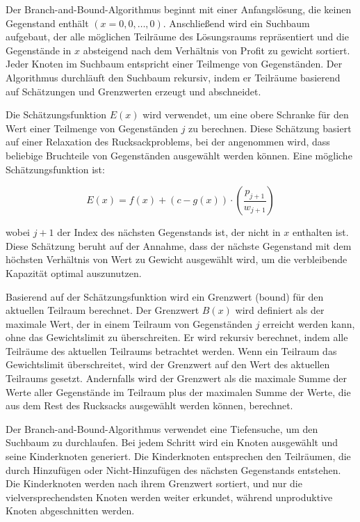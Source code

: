 Der Branch-and-Bound-Algorithmus beginnt mit einer 
Anfangslösung, die keinen Gegenstand enthält 
$(x = {0, 0, \ldots, 0})$. Anschließend wird ein Suchbaum 
aufgebaut, der alle möglichen Teilräume des Lösungsraums 
repräsentiert und die Gegenstände in $x$ absteigend nach dem Verhältnis 
von Profit zu gewicht sortiert. Jeder Knoten im Suchbaum entspricht einer 
Teilmenge von Gegenständen. Der Algorithmus durchläuft den 
Suchbaum rekursiv, indem er Teilräume basierend auf 
Schätzungen und Grenzwerten erzeugt und abschneidet.

Die Schätzungsfunktion $E(x)$ wird verwendet, um eine obere 
Schranke für den Wert einer Teilmenge von Gegenständen $j$ zu 
berechnen. Diese Schätzung basiert auf einer Relaxation des 
Rucksackproblems, bei der angenommen wird, dass beliebige 
Bruchteile von Gegenständen ausgewählt werden können. Eine 
mögliche Schätzungsfunktion ist:

\begin{equation}
    E(x) = f(x) + (c - g(x)) \cdot \left(\frac{p_{j+1}}{w_{j+1}}\right)
\end{equation}

\noindent wobei $j + 1$ der Index des nächsten Gegenstands ist, der nicht 
in $x$ enthalten ist. Diese Schätzung beruht auf der Annahme, 
dass der nächste Gegenstand mit dem höchsten Verhältnis von 
Wert zu Gewicht ausgewählt wird, um die verbleibende 
Kapazität optimal auszunutzen.

Basierend auf der Schätzungsfunktion wird ein Grenzwert 
(bound) für den aktuellen Teilraum berechnet. Der Grenzwert 
$B(x)$ wird definiert als der maximale Wert, der in einem 
Teilraum von Gegenständen $j$ erreicht werden kann, ohne das 
Gewichtslimit zu überschreiten. Er wird 
rekursiv berechnet, indem alle Teilräume des aktuellen 
Teilraums betrachtet werden. Wenn ein Teilraum das 
Gewichtslimit überschreitet, wird der Grenzwert auf den Wert 
des aktuellen Teilraums gesetzt. Andernfalls wird der 
Grenzwert als die maximale Summe der Werte aller Gegenstände 
im Teilraum plus der maximalen Summe der Werte, die aus dem 
Rest des Rucksacks ausgewählt werden können, berechnet.

Der Branch-and-Bound-Algorithmus verwendet eine Tiefensuche, 
um den Suchbaum zu durchlaufen. Bei jedem Schritt wird ein 
Knoten ausgewählt und seine Kinderknoten generiert. Die 
Kinderknoten entsprechen den Teilräumen, die durch 
Hinzufügen oder Nicht-Hinzufügen des nächsten Gegenstands 
entstehen. Die Kinderknoten werden nach ihrem Grenzwert 
sortiert, und nur die vielversprechendsten Knoten werden 
weiter erkundet, während unproduktive Knoten abgeschnitten 
werden.


